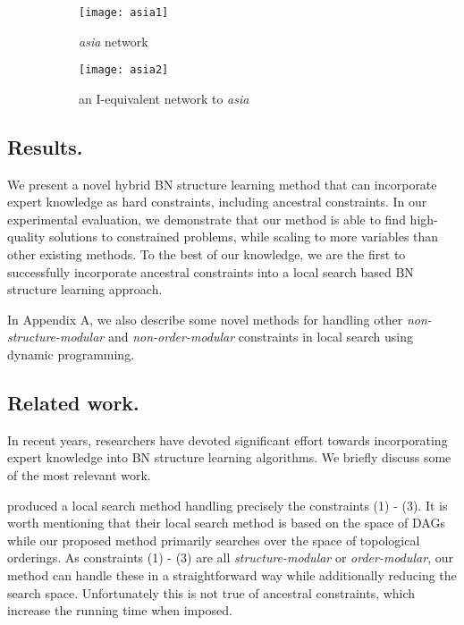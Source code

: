 \documentclass[twoside,11pt]{article}
\begin{document}
\begin{figure}[t]
	\centering
	\begin{subfigure}[t]{0.45\textwidth}
		\centering
		\texttt{[image: asia1]}
		\caption{\emph{asia} network}
	\end{subfigure}
	\qquad
	\begin{subfigure}[t]{0.45\textwidth}
		\centering
		\texttt{[image: asia2]}
		\caption{an I-equivalent network to \emph{asia}}
	\end{subfigure}
	\caption{}
\end{figure}

\subsection{Results.} We present a novel hybrid BN structure learning method that can incorporate expert knowledge as hard constraints,
including ancestral constraints. In our experimental evaluation, we demonstrate that our method is able to find high-quality solutions to 
constrained problems, while scaling to more variables than other existing methods. To the best of our knowledge, we are the first to 
successfully incorporate ancestral constraints into a local search based BN structure learning approach. 

\medskip
In Appendix A, we also describe some novel methods for handling other \emph{non-structure-modular} and \emph{non-order-modular} 
constraints in local search using dynamic programming. 


\subsection{Related work.} In recent years, researchers have devoted significant effort towards incorporating expert knowledge into
BN structure learning algorithms. We briefly discuss some of the most relevant work.

\medskip
\cite{CamposC07} produced a local search method  handling precisely the constraints (1) - (3). It is
worth mentioning that their local search method is based on the space of DAGs while our proposed method primarily searches
over the space of topological orderings. As constraints (1) - (3) are all \emph{structure-modular} or \emph{order-modular}, our
method can handle these in a straightforward way while additionally reducing the search space. Unfortunately this is not true of ancestral
constraints, which increase the running time when imposed.
\end{document}
